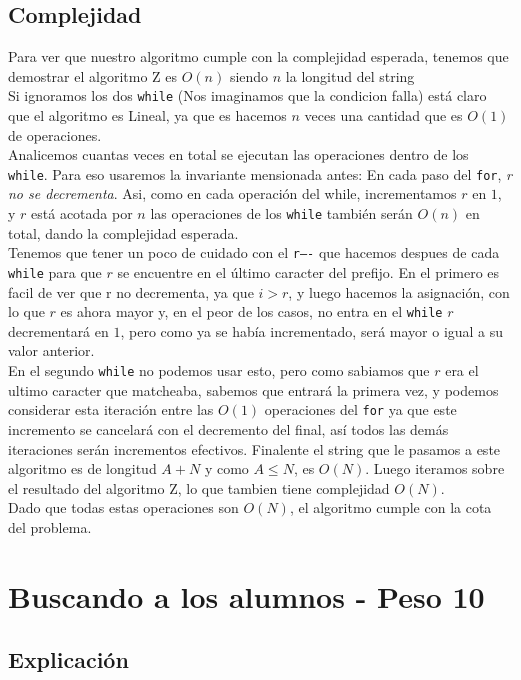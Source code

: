\documentclass[a4paper]{article}
\begin{document}
\subsection{Complejidad}
Para ver que nuestro algoritmo cumple con la complejidad esperada, tenemos que demostrar el algoritmo Z es $O(n)$ siendo $n$ la longitud del string\\
Si ignoramos los dos {\tt while} (Nos imaginamos que la condicion falla) est\'a claro que el algoritmo es Lineal, ya que es hacemos $n$ veces una cantidad que es $O(1)$ de operaciones.\\
Analicemos cuantas veces en total se ejecutan las operaciones dentro de los {\tt while}. Para eso usaremos la invariante mensionada antes: En cada paso del {\tt for}, \emph{r no se decrementa}.
Asi, como en cada operaci\'on del while, incrementamos $r$ en $1$, y $r$ est\'a acotada por $n$ las operaciones de los {\tt while} tambi\'en ser\'an $O(n)$ en total, dando la complejidad esperada.\\
Tenemos que tener un poco de cuidado con el {\tt r----} que hacemos despues de cada {\tt while} para que $r$ se encuentre en el \'ultimo caracter del prefijo. En el primero es facil de ver que r no decrementa, ya que $i>r$, y luego hacemos la asignaci\'on, con lo que $r$ es ahora mayor y, en el peor de los casos, no entra en el {\tt while} $r$ decrementar\'a en $1$, pero como ya se hab\'ia incrementado, ser\'a mayor o igual a su valor anterior.\\
En el segundo {\tt while} no podemos usar esto, pero como sabiamos que $r$ era el ultimo caracter que matcheaba, sabemos que entrar\'a la primera vez, y podemos considerar esta iteraci\'on entre las $O(1)$ operaciones del {\tt for} ya que este incremento se cancelar\'a con el decremento del final, as\'i todos las dem\'as iteraciones ser\'an incrementos efectivos.
Finalente el string que le pasamos a este algoritmo es de longitud $A+N$ y como $A \leq N$, es $O(N)$.
Luego iteramos sobre el resultado del algoritmo Z, lo que tambien tiene complejidad $O(N)$. \\
Dado que todas estas operaciones son $O(N)$, el algoritmo cumple con la cota del problema. 





\pagebreak
\section{Buscando a los alumnos - Peso 10}
\subsection{Explicación}
\end{document}
